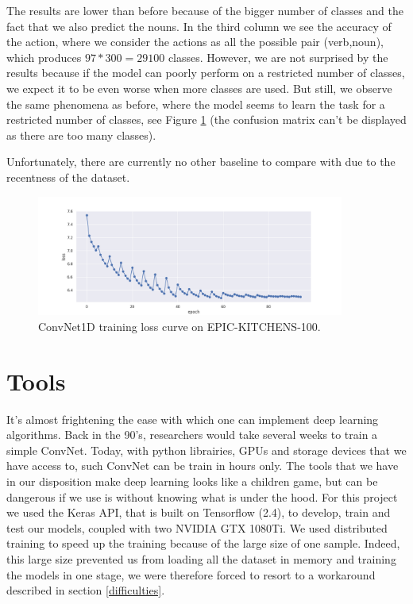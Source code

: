 \documentclass[12pt, a4paper]{report}
\begin{document}
			The results are lower than before because of the bigger number of classes and the fact that we also predict the nouns.
			In the third column we see the accuracy of the action, where we consider the actions as all the possible pair (verb,noun), which produces $97*300=29100$ classes.
			However, we are not surprised by the results because if the model can poorly perform on a restricted number of classes, we expect it to be even worse when more classes are used.
			But still, we observe the same phenomena as before, where the model seems to learn the task for a restricted number of classes, see Figure \ref{convnet_curve} (the confusion matrix can't be displayed as there are too many classes).
			\par
			Unfortunately, there are currently no other baseline to compare with due to the recentness of the dataset.
			\begin{figure}[h!]
				\centering
				\includegraphics[width=0.9\textwidth]{convnet1Df_curve.png}
				\caption{ConvNet1D training loss curve on EPIC-KITCHENS-100.}
				\label{convnet_curve}
			\end{figure}
		\section{Tools}
			It's almost frightening the ease with which one can implement deep learning algorithms.
			Back in the 90's, researchers would take several weeks to train a simple ConvNet.
			Today, with python librairies, GPUs and storage devices that we have access to, such ConvNet can be train in hours only.
			The tools that we have in our disposition make deep learning looks like a children game, but can be dangerous if we use is without knowing what is under the hood.
			For this project we used the Keras API, that is built on Tensorflow (2.4), to develop, train and test our models, coupled with two NVIDIA GTX 1080Ti.
			We used distributed training to speed up the training because of the large size of one sample.
			Indeed, this large size prevented us from loading all the dataset in memory and training the models in one stage, we were therefore forced to resort to a workaround described in section \ref{difficulties}.
\end{document}
